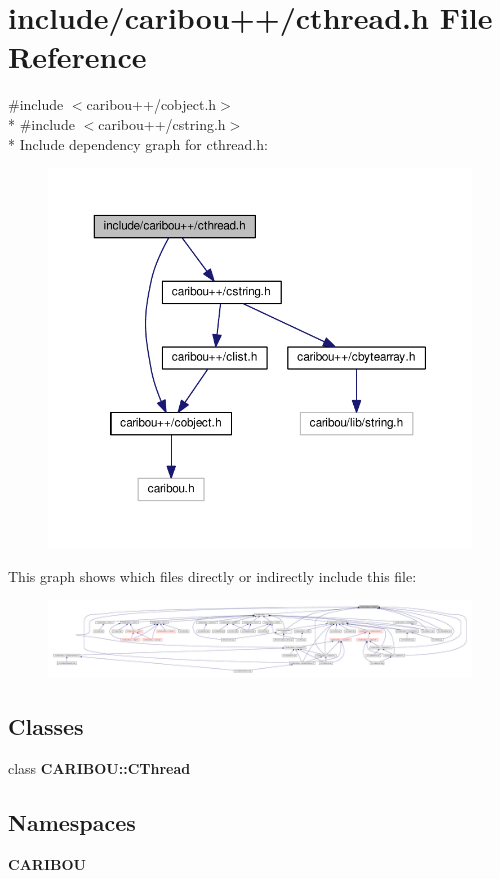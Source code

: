 \section{include/caribou++/cthread.h File Reference}
\label{cthread_8h}
{\ttfamily \#include $<$caribou++/cobject.\-h$>$}\\*
{\ttfamily \#include $<$caribou++/cstring.\-h$>$}\\*
Include dependency graph for cthread.\-h\-:\nopagebreak
\begin{figure}[H]
\begin{center}
\leavevmode
\includegraphics[width=350pt]{cthread_8h__incl}
\end{center}
\end{figure}
This graph shows which files directly or indirectly include this file\-:\nopagebreak
\begin{figure}[H]
\begin{center}
\leavevmode
\includegraphics[width=350pt]{cthread_8h__dep__incl}
\end{center}
\end{figure}
\subsection*{Classes}
\begin{DoxyCompactItemize}
\item 
class {\bf C\-A\-R\-I\-B\-O\-U\-::\-C\-Thread}
\end{DoxyCompactItemize}
\subsection*{Namespaces}
\begin{DoxyCompactItemize}
\item 
{\bf C\-A\-R\-I\-B\-O\-U}
\end{DoxyCompactItemize}
